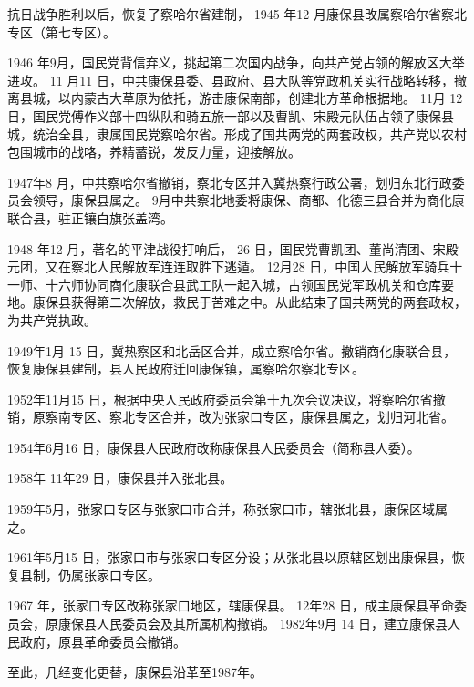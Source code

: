 抗日战争胜利以后，恢复了察哈尔省建制， 1945 年12 月康保县改属察哈尔省察北专区（第七专区）。

1946 年9月，国民党背信弃义，挑起第二次国内战争，向共产党占领的解放区大举进攻。 11 月11 日，中共康保县委、县政府、县大队等党政机关实行战略转移，撤离县城，以内蒙古大草原为依托，游击康保南部，创建北方革命根据地。 11月 12 日，国民党傅作义部十四纵队和骑五旅一部以及曹凯、宋殿元队伍占领了康保县城，统治全县，隶属国民党察哈尔省。形成了国共两党的两套政权，共产党以农村包围城市的战咯，养精蓄锐，发反力量，迎接解放。

1947年8 月，中共察哈尔省撤销，察北专区并入冀热察行政公署，划归东北行政委员会领导，康保县属之。 9月中共察北地委将康保、商都、化德三县合并为商化康联合县，驻正镶白旗张盖湾。

1948 年12 月，著名的平津战役打响后， 26 日，国民党曹凯团、董尚清团、宋殿元团，又在察北人民解放军连连取胜下逃遁。 12月28 日，中国人民解放军骑兵十一师、十六师协同商化康联合县武工队一起入城，占领国民党军政机关和仓库要地。康保县获得第二次解放，救民于苦难之中。从此结束了国共两党的两套政权，为共产党执政。

1949年1月 15 日，冀热察区和北岳区合并，成立察哈尔省。撤销商化康联合县，恢复康保县建制，县人民政府迁回康保镇，属察哈尔察北专区。

1952年11月15 日，根据中央人民政府委员会第十九次会议决议，将察哈尔省撤销，原察南专区、察北专区合并，改为张家口专区，康保县属之，划归河北省。

1954年6月16 日，康保县人民政府改称康保县人民委员会（简称县人委）。

1958年 11年29 日，康保县并入张北县。

1959年5月，张家口专区与张家口市合并，称张家口市，辖张北县，康保区域属之。

1961年5月15 日，张家口市与张家口专区分设；从张北县以原辖区划出康保县，恢复县制，仍属张家口专区。

1967 年，张家口专区改称张家口地区，辖康保县。 12年28 日，成主康保县革命委员会，原康保县人民委员会及其所属机构撤销。 1982年9月 14 日，建立康保县人民政府，原县革命委员会撤销。

至此，几经变化更替，康保县沿革至1987年。

